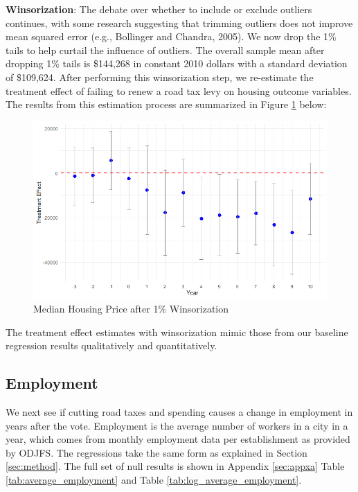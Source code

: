 \textbf{Winsorization}: The debate over whether to include or exclude outliers continues, with some research suggesting that trimming outliers does not improve mean squared error (e.g., Bollinger and Chandra, 2005).  We now drop the 1\% tails to help curtail the influence of outliers. The overall sample mean after dropping 1\% tails is \$144,268 in constant 2010 dollars with a standard deviation of \$109,624. After performing this winsorization step, we re-estimate the treatment effect of failing to renew a road tax levy on housing outcome variables. The results from this estimation process are summarized in Figure \ref{fig:tes_g_w} below:

\begin{figure}[htbp]
    \centering
    \includegraphics[width=\textwidth,keepaspectratio]{images/tes_g_w.png}
    \caption{Median Housing Price after 1\% Winsorization}
    \label{fig:tes_g_w}
\end{figure}

The treatment effect estimates with winsorization mimic those from our baseline regression results qualitatively and quantitatively.

\subsection{Employment} \label{sec:employment}

We next see if cutting road taxes and spending causes a change in employment in years after the vote. Employment is the average number of workers in a city in a year, which comes from monthly employment data per establishment as provided by ODJFS.  The regressions take the same form as explained in Section \ref{sec:method}.  The full set of null results is shown in Appendix \ref{sec:appxa} Table \ref{tab:average_employment} and Table \ref{tab:log_average_employment}.

